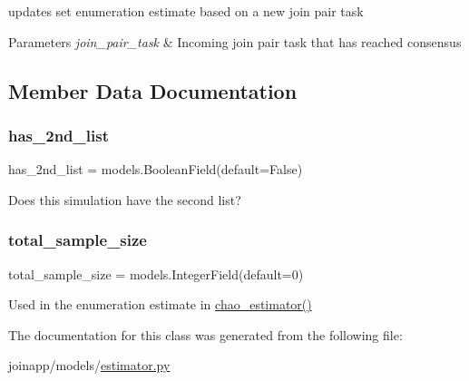 updates set enumeration estimate based on a new join pair task 


\begin{DoxyParams}{Parameters}
{\em join\+\_\+pair\+\_\+task} & Incoming join pair task that has reached consensus \\
\hline
\end{DoxyParams}


\subsection{Member Data Documentation}
\mbox{\label{classjoinapp_1_1models_1_1estimator_1_1_estimator_abee8b19cb56f38f5834e09e82ec9757b}} 
\subsubsection{\texorpdfstring{has\_2nd\_list}{has\_2nd\_list}}
{\footnotesize\ttfamily has\+\_\+2nd\+\_\+list = models.\+Boolean\+Field(default=False)\hspace{0.3cm}{\ttfamily [static]}}



Does this simulation have the second list? 

\mbox{\label{classjoinapp_1_1models_1_1estimator_1_1_estimator_a76d6a2f259d803ee6a381876fbb054d6}} 
\subsubsection{\texorpdfstring{total\_sample\_size}{total\_sample\_size}}
{\footnotesize\ttfamily total\+\_\+sample\+\_\+size = models.\+Integer\+Field(default=0)\hspace{0.3cm}{\ttfamily [static]}}



Used in the enumeration estimate in \mbox{\hyperlink{classjoinapp_1_1models_1_1estimator_1_1_estimator_a582efaf16c8455e890ef61101a863966}{chao\+\_\+estimator()}} 



The documentation for this class was generated from the following file\+:\begin{DoxyCompactItemize}
\item 
joinapp/models/\mbox{\hyperlink{estimator_8py}{estimator.\+py}}\end{DoxyCompactItemize}
